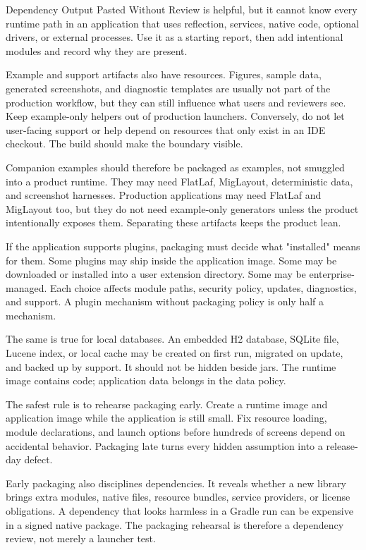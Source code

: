\begin{pitfallbox}{Dependency Output Pasted Without Review}
 is helpful, but it cannot know every runtime path in an application that uses reflection, services, native code, optional drivers, or external processes. Use it as a starting report, then add intentional modules and record why they are present.
\end{pitfallbox}

Example and support artifacts also have resources. Figures, sample data, generated screenshots, and diagnostic templates are usually not part of the production workflow, but they can still influence what users and reviewers see. Keep example-only helpers out of production launchers. Conversely, do not let user-facing support or help depend on resources that only exist in an IDE checkout. The build should make the boundary visible.

Companion examples should therefore be packaged as examples, not smuggled into a product runtime. They may need FlatLaf, MigLayout, deterministic data, and screenshot harnesses. Production applications may need FlatLaf and MigLayout too, but they do not need example-only generators unless the product intentionally exposes them. Separating these artifacts keeps the product lean.

If the application supports plugins, packaging must decide what "installed" means for them. Some plugins may ship inside the application image. Some may be downloaded or installed into a user extension directory. Some may be enterprise-managed. Each choice affects module paths, security policy, updates, diagnostics, and support. A plugin mechanism without packaging policy is only half a mechanism.

The same is true for local databases. An embedded H2 database, SQLite file, Lucene index, or local cache may be created on first run, migrated on update, and backed up by support. It should not be hidden beside jars. The runtime image contains code; application data belongs in the data policy.

The safest rule is to rehearse packaging early. Create a runtime image and application image while the application is still small. Fix resource loading, module declarations, and launch options before hundreds of screens depend on accidental behavior. Packaging late turns every hidden assumption into a release-day defect.

Early packaging also disciplines dependencies. It reveals whether a new library brings extra modules, native files, resource bundles, service providers, or license obligations. A dependency that looks harmless in a Gradle run can be expensive in a signed native package. The packaging rehearsal is therefore a dependency review, not merely a launcher test.

